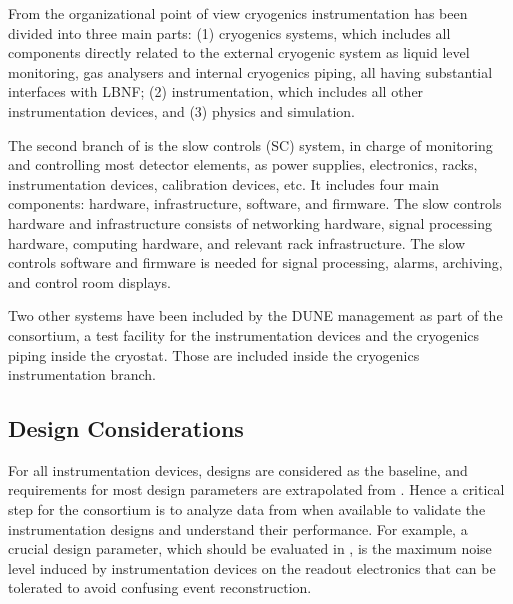 From the organizational point of view
cryogenics instrumentation has been divided into three main parts: (1) cryogenics systems, which includes all components directly related to the external cryogenic system as
liquid level monitoring, gas analysers and internal cryogenics piping, all having substantial interfaces with LBNF; (2) \lar  instrumentation, which includes all
other instrumentation devices, and (3) physics and simulation.


The second branch of  is the slow controls (SC) system, in charge of monitoring and controlling most detector elements, as power supplies, electronics, racks, instrumentation devices,
calibration devices, etc. It includes four main components: hardware, infrastructure,
software, and firmware. The slow controls hardware and infrastructure consists of
networking hardware, signal processing hardware, computing hardware, and relevant
rack infrastructure. The slow controls software and firmware is needed for
signal processing, alarms, archiving, and control room displays.

Two other systems have been included by the DUNE management as part of the  consortium,
a test facility for the instrumentation devices and the cryogenics piping inside the cryostat.
Those are included inside the cryogenics instrumentation branch.



\subsection{Design Considerations}
\label{sec:fdsp-slow-cryo-des-consid}


For all \lar instrumentation devices,  designs are
considered as the baseline, and requirements for most design
parameters are extrapolated from . Hence a critical step for
the  consortium is to analyze data from  when available
to validate the instrumentation designs and understand their
performance. For example, a crucial design parameter, which should be evaluated in ,
is the maximum noise level induced by instrumentation devices on the readout electronics that can be tolerated to avoid confusing event reconstruction. 

